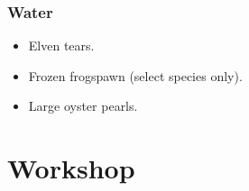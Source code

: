 \begin{multicols}{2}
\subsubsection{Water}

\begin{itemize}
  \item
  Elven tears.
  \item
  Frozen frogspawn (select species only).
  \item
  Large oyster pearls.
\end{itemize}

\end{multicols}

\section{ Workshop}

